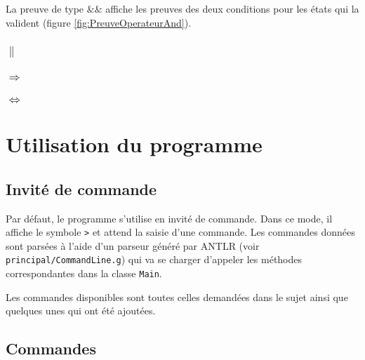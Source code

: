 \documentclass[dvipsnames]{report}
\begin{document}
La preuve de type $\&\&$ affiche les preuves des deux conditions pour les états qui la valident (figure \ref{fig:PreuveOperateurAnd}).



\subsubsection{$\|$}

\subsubsection{$\Rightarrow$}

\subsubsection{$\Leftrightarrow$}

\section{Utilisation du programme}

\subsection{Invité de commande}

Par défaut, le programme s'utilise en invité de commande. Dans ce mode, il affiche le symbole \texttt{>} et attend la saisie d'une commande. Les commandes données sont parsées à l'aide d'un parseur généré par ANTLR (voir \texttt{principal/CommandLine.g}) qui va se charger d'appeler les méthodes correspondantes dans la classe \texttt{Main}.

Les commandes disponibles sont toutes celles demandées dans le sujet ainsi que quelques unes qui ont été ajoutées.

\subsection{Commandes}
\end{document}
